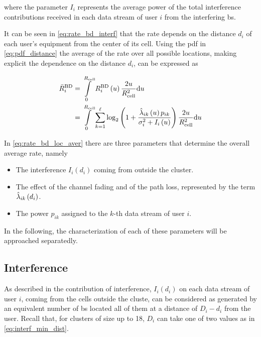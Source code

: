 \noindent
where the parameter $I_i$ represents the average power of the total interference
contributions received in each data stream of user $i$ from the interfering
\gls{bs}.

It can be seen in \eqref{eq:rate_bd_interf} that the rate depends on the distance $d_i$ of each user's equipment from the center of its cell. Using the pdf in
\eqref{eq:pdf_distance} the average of the rate over all possible locations,
making explicit the dependence on the distance $d_i$, can be expressed as

\begin{equation} \label{eq:rate_bd_loc_aver}
\begin{aligned}
    \bar{R}_i^{\text{BD}} &= \int\limits_0^{R_{\text{cell}}} R_i^{\text{BD}}\left(u
    \right) \frac{2u}{R_{\text{cell}}^2} \text{d} u \\
    &= \int\limits_0^{R_{\text{cell}}} \sum\limits_{k = 1}^{\ell} \log_2 \left(1 +
    \frac{\hat{\lambda}_{ik}\left(u\right) p_{ik}}{\sigma_i^2 + I_i\left(u\right)}
    \right) \frac{2u}{R_{\text{cell}}^2} \text{d} u
\end{aligned}
\end{equation}

In \eqref{eq:rate_bd_loc_aver} there are three parameters that determine the
overall average rate, namely

\begin{itemize}
    \item The interference $I_i\left(d_i\right)$ coming from outside the
        cluster.
    \item The effect of the channel fading and of the path loss, represented by
        the term $\hat{\lambda}_{ik}\left(d_i\right)$.
    \item The power $p_{ik}$ assigned to the $k$-th data stream of user $i$.
\end{itemize}

In the following, the characterization of each of these parameters will be
approached separatedly.

\subsection{Interference}\label{ssec:achiev_rate_interf}

As described in  the contribution of interference,
$I_i\left(d_i\right)$ on each data stream of user $i$, coming from the cells
outside the cluste, can be considered as generated by an equivalent number of
\gls{bs} located all of them at a distance of $D_i - d_i$ from the user. Recall
that, for clusters of size up to 18, $D_i$ can take one of two values as in
\eqref{eq:interf_min_dist}.

